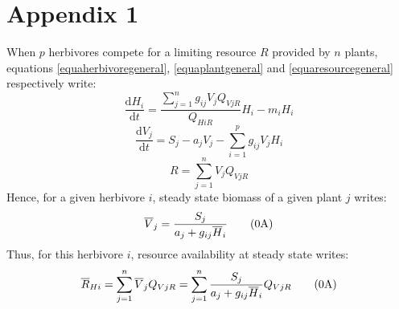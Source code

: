 \documentclass[12pt]{article}
\newcommand\equa[1]{\frac{\mathrm{d}#1}{\mathrm{d}t}}
\newcommand\barre[1]{\overline{\rule{0pt}{1.5ex}#1}}
\begin{document}
\section*{Appendix 1}
When $p$ herbivores compete for a limiting resource $R$ provided by $n$ plants, equations  \ref{equaherbivoregeneral}, \ref{equaplantgeneral} and \ref{equaresourcegeneral} respectively write:
\begin{equation}
\equa{H_i}= \frac{\displaystyle \sum _{j=1}^{n} g_{ij}V_j  Q_{VjR}}{Q_{HiR}} H_i - m_i H_i \tag{\theequation A}
\end{equation}
\begin{equation}
\equa{V_j}=S_j-a_jV_j-\sum ^p _{i=1} g_{ij}V_jH_i \tag{\theequation A}
\end{equation}
\begin{equation}
R=\sum _{j=1}^{n} V_j Q_{VjR} \tag{\theequation A}
\end{equation}
Hence, for a given herbivore $i$, steady state biomass of a given plant $j$ writes:
\begin{equation}
\barre{V}_j= \frac{S_j}{a_j + g_{ij} \barre{H}_i} \tag{\theequation A}
\end{equation}
Thus, for this herbivore $i$, resource availability at steady state writes:
\begin{equation}
\barre{R}_{Hi}=  \sum _{j=1}^{n} \barre{V}_j Q_{VjR} = \sum _{j=1}^{n} \frac{S_j}{a_j + g_{ij} \barre{H}_i} Q_{VjR} \tag{\theequation A}
\end{equation}
\end{document}
